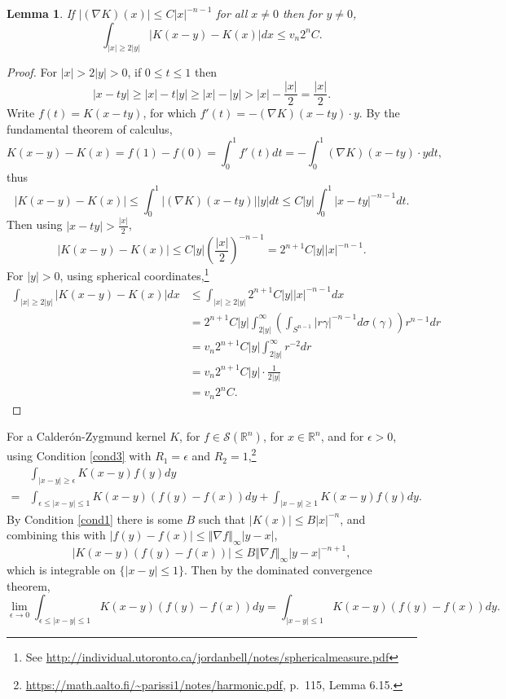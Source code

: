 \documentclass{article}
\newcommand{\norm}[1]{\left\Vert #1 \right\Vert}
\newtheorem{lemma}[theorem]{Lemma}
\theoremstyle{definition}
\begin{document}
\begin{lemma}
If $|(\nabla K)(x)| \leq C |x|^{-n-1}$ for all $x \neq 0$ then for $y \neq 0$,
\[
\int_{|x| \geq 2|y|} |K(x-y)-K(x)| dx \leq v_n 2^n C.
\]
\end{lemma}
\begin{proof}
For $|x|>2|y|>0$, if $0 \leq t \leq 1$ then
\[
|x-ty| \geq |x| - t|y|  \geq |x| - |y| > |x|-\frac{|x|}{2} = \frac{|x|}{2}.
\]
Write $f(t) = K(x-ty)$, for which $f'(t) = -(\nabla K)(x-ty) \cdot y$. By the fundamental theorem of calculus,
\[
K(x-y)-K(x) = f(1)-f(0) = \int_0^1 f'(t) dt = -\int_0^1 (\nabla K)(x-ty) \cdot y dt,
\]
thus
\[
|K(x-y)-K(x)| \leq \int_0^1 |(\nabla K)(x-ty)| |y| dt
\leq C |y| \int_0^1 |x-ty|^{-n-1} dt.
\]
Then using $|x-ty| > \frac{|x|}{2}$,
\[
|K(x-y)-K(x)| \leq C|y| \left( \frac{|x|}{2} \right)^{-n-1} 
=2^{n+1} C |y| |x|^{-n-1}.
\]
For $|y|>0$, using spherical coordinates,\footnote{See \url{http://individual.utoronto.ca/jordanbell/notes/sphericalmeasure.pdf}}
\begin{align*}
\int_{|x| \geq 2|y|} |K(x-y)-K(x)| dx&\leq \int_{|x| \geq 2|y|} 2^{n+1} C |y| |x|^{-n-1} dx\\
&=2^{n+1} C |y| \int_{2|y|}^\infty \left( \int_{S^{n-1}} |r\gamma|^{-n-1}  d\sigma(\gamma) \right) r^{n-1} dr\\
&=v_n 2^{n+1} C|y| \int_{2|y|}^\infty r^{-2} dr\\
&=v_n 2^{n+1} C |y| \cdot \frac{1}{2|y|}\\
&=v_n 2^n C.
\end{align*}
\end{proof}


For a Calder\'on-Zygmund kernel $K$, for $f \in \mathscr{S}(\mathbb{R}^n)$,  for $x \in \mathbb{R}^n$, and for $\epsilon>0$,
using Condition \ref{cond3} with $R_1=\epsilon$ and $R_2=1$,\footnote{\url{https://math.aalto.fi/~parissi1/notes/harmonic.pdf},
p.~115, Lemma 6.15.}
\[
\begin{split}
&\int_{|x-y| \geq \epsilon} K(x-y) f(y) dy\\
=&\int_{\epsilon \leq |x-y| \leq 1} K(x-y) (f(y)-f(x)) dy + \int_{|x-y| \geq 1} K(x-y) f(y) dy.
\end{split}
\]
By Condition \ref{cond1} there is some $B$ such that 
$|K(x)| \leq B|x|^{-n}$, and combining this with $|f(y)-f(x)| \leq \norm{\nabla f}_{\infty} |y-x|$,
\[
|K(x-y)(f(y)-f(x))| \leq B\norm{\nabla f}_\infty  |y-x|^{-n+1},
\]
which is integrable on $\{|x-y| \leq 1\}$. Then by the dominated convergence theorem,
\[
\lim_{\epsilon \to 0} \int_{\epsilon \leq |x-y| \leq 1} K(x-y) (f(y)-f(x)) dy 
=\int_{|x-y| \leq 1} K(x-y) (f(y)-f(x)) dy.
\]
\end{document}
